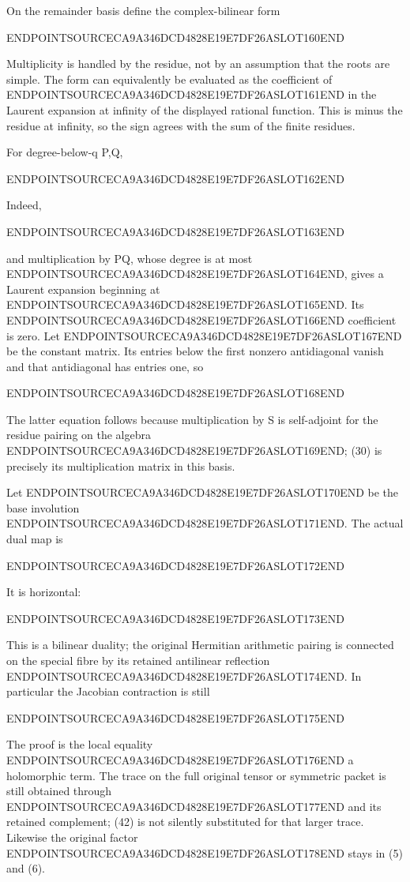 On the remainder basis define the complex-bilinear form

ENDPOINTSOURCECA9A346DCD4828E19E7DF26ASLOT160END

Multiplicity is handled by the residue, not by an assumption that the roots are simple. The form can equivalently be evaluated as the coefficient of ENDPOINTSOURCECA9A346DCD4828E19E7DF26ASLOT161END in the Laurent expansion at infinity of the displayed rational function. This is minus the residue at infinity, so the sign agrees with the sum of the finite residues.

For degree-below-q P,Q,

ENDPOINTSOURCECA9A346DCD4828E19E7DF26ASLOT162END

Indeed,

ENDPOINTSOURCECA9A346DCD4828E19E7DF26ASLOT163END

and multiplication by PQ, whose degree is at most ENDPOINTSOURCECA9A346DCD4828E19E7DF26ASLOT164END, gives a Laurent expansion beginning at ENDPOINTSOURCECA9A346DCD4828E19E7DF26ASLOT165END. Its ENDPOINTSOURCECA9A346DCD4828E19E7DF26ASLOT166END coefficient is zero. Let ENDPOINTSOURCECA9A346DCD4828E19E7DF26ASLOT167END be the constant matrix. Its entries below the first nonzero antidiagonal vanish and that antidiagonal has entries one, so

ENDPOINTSOURCECA9A346DCD4828E19E7DF26ASLOT168END

The latter equation follows because multiplication by S is self-adjoint for the residue pairing on the algebra ENDPOINTSOURCECA9A346DCD4828E19E7DF26ASLOT169END; (30) is precisely its multiplication matrix in this basis.

Let ENDPOINTSOURCECA9A346DCD4828E19E7DF26ASLOT170END be the base involution ENDPOINTSOURCECA9A346DCD4828E19E7DF26ASLOT171END. The actual dual map is

ENDPOINTSOURCECA9A346DCD4828E19E7DF26ASLOT172END

It is horizontal:

ENDPOINTSOURCECA9A346DCD4828E19E7DF26ASLOT173END

This is a bilinear duality; the original Hermitian arithmetic pairing is connected on the special fibre by its retained antilinear reflection ENDPOINTSOURCECA9A346DCD4828E19E7DF26ASLOT174END. In particular the Jacobian contraction is still

ENDPOINTSOURCECA9A346DCD4828E19E7DF26ASLOT175END

The proof is the local equality ENDPOINTSOURCECA9A346DCD4828E19E7DF26ASLOT176END a holomorphic term. The trace on the full original tensor or symmetric packet is still obtained through ENDPOINTSOURCECA9A346DCD4828E19E7DF26ASLOT177END and its retained complement; (42) is not silently substituted for that larger trace. Likewise the original factor ENDPOINTSOURCECA9A346DCD4828E19E7DF26ASLOT178END stays in (5) and (6).

